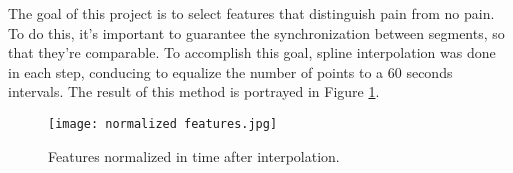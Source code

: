The goal of this project is to select features that distinguish pain from no pain. To do this, it’s important to guarantee the synchronization between segments, so that they’re comparable. To accomplish this goal, spline interpolation was done in each step, conducing to equalize the number of points to a 60 seconds intervals. The result of this method is portrayed in Figure \ref{fig:normalizedfeatures}. 

\begin{figure}[h!]
    \centering
    \texttt{[image: normalized features.jpg]}
    \caption{Features normalized in time after interpolation.}
    \label{fig:normalizedfeatures}
\end{figure}












